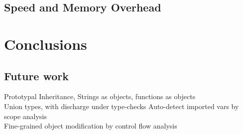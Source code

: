 \documentclass[12pt,a4paper,twoside,openright]{report}
\begin{document}
\section{Speed and Memory Overhead}


\chapter{Conclusions}
\section{Future work}
Prototypal Inheritance, Strings as objects, functions as objects \\
Union types, with discharge under type-checks
Auto-detect imported vars by scope analysis \\
Fine-grained object modification by control flow analysis
\end{document}
